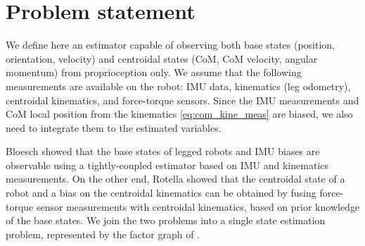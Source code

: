 



\section{Problem statement}

We define here an estimator capable of observing both base states (position, orientation, velocity) and centroidal states (CoM, CoM velocity, angular momentum) from proprioception
only. We assume that the following measurements are available on the robot: IMU data, kinematics (leg odometry), centroidal kinematics, and force-torque sensors. 
Since the IMU measurements  and CoM local position from the kinematics \eqref{eq:com_kine_meas} are biased, we also need to integrate them to the estimated
variables.

Bloesch \cite{bloesch2013state} showed that the base states of legged robots and IMU biases are observable using a tightly-coupled estimator based on IMU and kinematics measurements.
On the other end, Rotella \cite{rotella2015humanoid} showed that the centroidal state of a robot and a bias on the centroidal kinematics can be obtained by fusing 
force-torque sensor measurements with centroidal kinematics, based on prior knowledge of the base states. We join the two problems into a single state estimation problem, 
represented by the factor graph of .  

